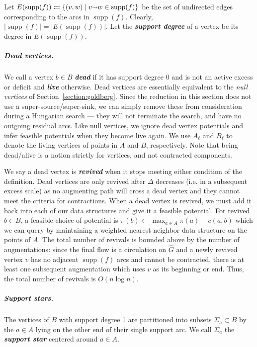 \documentclass[a4paper,UKenglish]{socg-lipics-v2018}
\def\abs#1{\mathopen| #1 \mathclose|}		%
\def\arcto{\mathord\shortrightarrow}
\def\arc#1#2{#1\arcto#2}
\def\supp{\operatorname{supp}}
\theoremstyle{plain}
\numberwithin{figure}{section}
\renewcommand{\paragraph}{\subparagraph}
\def\EMPH#1{\textbf{\emph{\boldmath #1}}}
\begin{document}
Let $E(\supp(f)) \coloneqq \{(v, w) \mid \arc vw \in \supp(f)\}$ be the set
of undirected edges corresponding to the arcs in $\supp(f)$.
Clearly, $\abs{\supp(f)} = \abs{E(\supp(f))}$.
Let the \EMPH{support degree} of a vertex be its degree in $E(\supp(f))$.

\paragraph{Dead vertices.}
We call a vertex $b \in B$ \EMPH{dead} if it has support degree 0 and is not an
active excess or deficit and \EMPH{live} otherwise.
Dead vertices are essentially equivalent to the \emph{null vertices} of
Section~\ref{section:goldberg}.
Since the reduction in this section does not use a super-source/super-sink,
we can simply remove these from consideration during a Hungarian search ---
they will not terminate the search, and have no outgoing residual arcs.
Like null vertices, we ignore dead vertex potentials and infer feasible
potentials when they become live again.
We use \EMPH{$A_\ell$} and \EMPH{$B_\ell$} to denote the living
vertices of points in $A$ and $B$, respectively.
Note that being dead/alive is a notion strictly for vertices, and not
contracted components.

We say a dead vertex is \EMPH{revived} when it stops meeting either condition
of the definition.
Dead vertices are only revived after $\Delta$ decreases (i.e. in a
subsequent excess scale) as no augmenting path will cross a dead vertex and
they cannot meet the criteria for contractions.
When a dead vertex is revived, we must add it back into each of our data
structures and give it a feasible potential.
For revived $b \in B$, a feasible choice of potential is
$\pi(b) \gets \max_{a \in A} \pi(a) - c(a, b)$ which we can query by
maintaining a weighted nearest neighbor data structure on the points of $A$.
The total number of revivals is bounded above by the number of augmentations:
since the final flow is a circulation on $\hat{G}$ and a newly revived vertex
$v$ has no adjacent $\supp(f)$ arcs and cannot be contracted, there is at least
one subsequent augmentation which uses $v$ as its beginning or end.
Thus, the total number of revivals is $O(n\log n)$.

\paragraph{Support stars.}
The vertices of $B$ with support degree 1 are partitioned into subsets
$\Sigma_a \subset B$ by the $a \in A$ lying on the other end of their single
support arc.
We call $\Sigma_a$ the \EMPH{support star} centered around $a \in A$.
\end{document}
